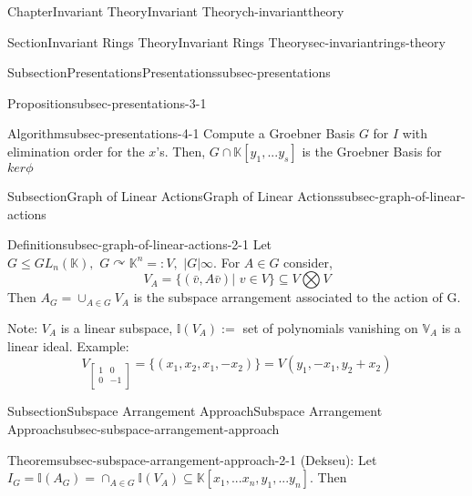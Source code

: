\documentclass[oneside,10pt,]{book}
\newcommand{\amp}{&}
\begin{document}
\begin{chapterptx}{Chapter}{Invariant Theory}{}{Invariant Theory}{}{}{ch-invarianttheory}
\begin{sectionptx}{Section}{Invariant Rings Theory}{}{Invariant Rings Theory}{}{}{sec-invariantrings-theory}
\begin{subsectionptx}{Subsection}{Presentations}{}{Presentations}{}{}{subsec-presentations}
\begin{proposition}{Proposition}{}{}{subsec-presentations-3-1}
%
\end{proposition}
%
\par
\begin{algorithm}{Algorithm}{}{}{subsec-presentations-4-1}%
Compute a Groebner Basis \(G\) for \(I\) with elimination order for the \(x\)'s. Then, \(G \cap \mathbb{K}[y_1,...y_s]\)  is the Groebner Basis for \(ker \phi\)%
\end{algorithm}
%
\end{subsectionptx}
%
%
\typeout{************************************************}
\typeout{************************************************}
%
\begin{subsectionptx}{Subsection}{Graph of Linear Actions}{}{Graph of Linear Actions}{}{}{subsec-graph-of-linear-actions}
\begin{definition}{Definition}{}{subsec-graph-of-linear-actions-2-1}%
Let \(G \leq GL_n(\mathbb{K}), \,\, G\curvearrowright \mathbb{K}^n =:V, \,\, |G|\infty\). For \(A\in G\) consider,%
\begin{equation*}
V_A = \{(\bar v, A\bar v)|\,\,v\in V\} \subseteq V\bigotimes V
\end{equation*}
Then \(A_G = \cup_{A\in G}V_A\) is the subspace arrangement associated to the action of G.%
\end{definition}
%
\par
Note: \(V_A\) is a linear subspace, \(\mathbb{I}(V_A):=\) set of polynomials vanishing on \(\mathbb{V}_A\) is a linear ideal. Example:%
\begin{equation*}
V_{\begin{bmatrix}
1 \amp 0 \\
0 \amp -1 \\
\end{bmatrix}} = \{(x_1,x_2,x_1,-x_2)\} = V(y_1,-x_1, y_2+x_2)
\end{equation*}
%
\end{subsectionptx}
%
%
\typeout{************************************************}
\typeout{************************************************}
%
\begin{subsectionptx}{Subsection}{Subspace Arrangement Approach}{}{Subspace Arrangement Approach}{}{}{subsec-subspace-arrangement-approach}
\begin{theorem}{Theorem}{}{}{subsec-subspace-arrangement-approach-2-1}%
(Dekseu): Let \(I_G = \mathbb{I}(A_G) = \cap_{A\in G}\mathbb{I}(V_A) \subseteq \mathbb{K}[x_1,...x_n,y_1,...y_n].\) Then%
\begin{equation*}

\end{equation*}
\end{theorem}
\end{subsectionptx}
\end{sectionptx}
\end{chapterptx}
\end{document}
